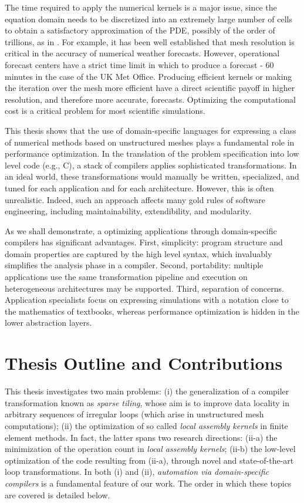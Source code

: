 The time required to apply the numerical kernels is a major issue, since the equation domain needs to be discretized into an extremely large number of cells to obtain a satisfactory approximation of the PDE, possibly of the order of trillions, as in \cite{Rossinelli2013}. For example, it has been well established that mesh resolution is critical in the accuracy of numerical weather forecasts. However, operational forecast centers have a strict time limit in which to produce a forecast - 60 minutes in the case of the UK Met Office. Producing efficient kernels or making the iteration over the mesh more efficient have a direct scientific payoff in higher resolution, and therefore more accurate, forecasts. Optimizing the computational cost is a critical problem for most scientific simulations.

This thesis shows that the use of domain-specific languages for expressing a class of numerical methods based on unstructured meshes plays a fundamental role in performance optimization. In the translation of the problem specification into low level code (e.g., C), a stack of compilers applies sophisticated transformations. In an ideal world, these transformations would manually be written, specialized, and tuned for each application and for each architecture. However, this is often unrealistic. Indeed, such an approach affects many gold rules of software engineering, including maintainability, extendibility, and modularity.

As we shall demonstrate, a optimizing applications through domain-specific compilers has significant advantages. First, simplicity: program structure and domain properties are captured by the high level syntax, which invaluably simplifies the analysis phase in a compiler. Second, portability: multiple applications use the same transformation pipeline and execution on heterogeneous architectures may be supported. Third, separation of concerns. Application specialists focus on expressing simulations with a notation close to the mathematics of textbooks, whereas performance optimization is hidden in the lower abstraction layers. 

\section{Thesis Outline and Contributions}
\label{sec:contributions}
This thesis investigates two main problems: (i) the generalization of a compiler transformation known as {\em sparse tiling}, whose aim is to improve data locality in arbitrary sequences of irregular loops (which arise in unstructured mesh computations); (ii) the optimization of so called {\em local assembly kernels} in finite element methods. In fact, the latter spans two research directions: (ii-a) the minimization of the operation count in {\em local assembly kernels}; (ii-b) the low-level optimization of the code resulting from (ii-a), through novel and state-of-the-art loop transformations. In both (i) and (ii), {\it automation via domain-specific compilers} is a fundamental feature of our work. The order in which these topics are covered is detailed below.

